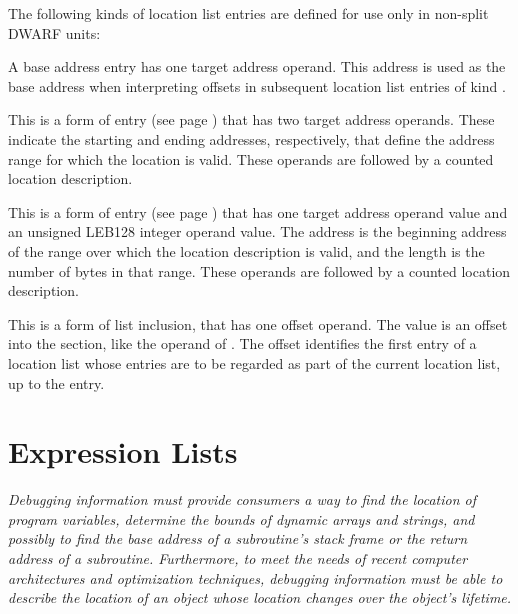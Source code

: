 The following kinds of location list entries are defined for
use only in non-split DWARF units:

\begin{enumerate}[1. ]
\addtocounter{enumi}{6}
\itembfnl{\DWLLEbaseaddressTARG}
A base address entry has one target address operand.
This address is used as the base address when interpreting
offsets in subsequent location list entries of kind
\DWLLEoffsetpair.

\itembfnl{\DWLLEstartendTARG}
This is a form of  entry
\bb
(see page \pageref{text:bndlocdesc})
\eb
that has two target address operands. These indicate the
starting and ending addresses, respectively, that define
the address range for which the location is valid.
These operands are followed by a counted location description.

\itembfnl{\DWLLEstartlengthTARG}
This is a form of  entry
\bb
(see page \pageref{text:bndlocdesc})
\eb
that has one target address operand value and an unsigned LEB128
integer operand value. The address is the beginning address
of the range over which the location description is valid, and
the length is the number of bytes in that range.
These operands are followed by a counted location description.

\bb
\itembfnl{\DWLLEincludeloclistTARG}
This is a form of list inclusion, that has one offset operand.  The
value is an offset into the \dotdebugloclists{} section, like the
operand of \DWFORMsecoffset{}.  The offset identifies the
first entry of a location list whose entries are to be regarded as part of
the current location  list, up to the \DWLLEendoflist{} entry.
\eb

\end{enumerate}

\section{Expression Lists}
\label{chap:expressionlists}
\textit{Debugging information
must
provide consumers a way to find
the location of program variables, determine the bounds
of dynamic arrays and strings, and possibly to find the
base address of a subroutine\textquoteright s stack frame or the return
address of a subroutine. Furthermore, to meet the needs of
recent computer architectures and optimization techniques,
debugging information must be able to describe the location of
an object whose location changes over the object\textquoteright s lifetime.}

